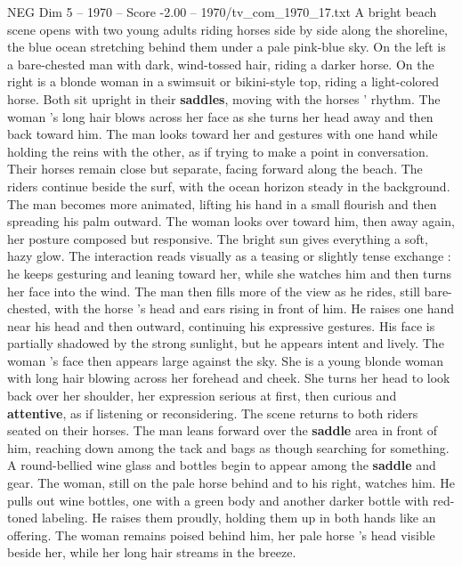 \begin{textsample}{NEG Dim 5 – 1970 – Score -2.00 – 1970/tv\_com\_1970\_17.txt}  \label{ex:f5_neg_003}
A bright beach scene opens with two young adults riding horses side by side along the shoreline, the blue ocean stretching behind them under a pale pink-blue sky.
On the left is a bare-chested man with dark, wind-tossed hair, riding a darker horse.
On the right is a blonde woman in a swimsuit or bikini-style top, riding a light-colored horse.
Both sit upright in their \textbf{saddles}, moving with the horses ’ rhythm.
The woman ’s long hair blows across her face as she turns her head away and then back toward him.
The man looks toward her and gestures with one hand while holding the reins with the other, as if trying to make a point in conversation.
Their horses remain close but separate, facing forward along the beach.
The riders continue beside the surf, with the ocean horizon steady in the background.
The man becomes more animated, lifting his hand in a small flourish and then spreading his palm outward.
The woman looks over toward him, then away again, her posture composed but responsive.
The bright sun gives everything a soft, hazy glow.
The interaction reads visually as a teasing or slightly tense exchange : he keeps gesturing and leaning toward her, while she watches him and then turns her face into the wind.
The man then fills more of the view as he rides, still bare-chested, with the horse ’s head and ears rising in front of him.
He raises one hand near his head and then outward, continuing his expressive gestures.
His face is partially shadowed by the strong sunlight, but he appears intent and lively.
The woman ’s face then appears large against the sky.
She is a young blonde woman with long hair blowing across her forehead and cheek.
She turns her head to look back over her shoulder, her expression serious at first, then curious and \textbf{attentive}, as if listening or reconsidering.
The scene returns to both riders seated on their horses.
The man leans forward over the \textbf{saddle} area in front of him, reaching down among the tack and bags as though searching for something.
A round-bellied wine glass and bottles begin to appear among the \textbf{saddle} and gear.
The woman, still on the pale horse behind and to his right, watches him.
He pulls out wine bottles, one with a green body and another darker bottle with red-toned labeling.
He raises them proudly, holding them up in both hands like an offering.
The woman remains poised behind him, her pale horse ’s head visible beside her, while her long hair streams in the breeze.

\end{textsample}
